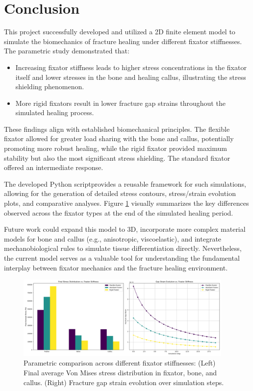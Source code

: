 \documentclass{article}
\begin{document}
\section{Conclusion}
This project successfully developed and utilized a 2D finite element model to simulate the biomechanics of fracture healing under different fixator stiffnesses. The parametric study demonstrated that:
\begin{itemize}
  \item Increasing fixator stiffness leads to higher stress concentrations in the fixator itself and lower stresses in the bone and healing callus, illustrating the stress shielding phenomenon.
  \item More rigid fixators result in lower fracture gap strains throughout the simulated healing process.
\end{itemize}
These findings align with established biomechanical principles. The flexible fixator allowed for greater load sharing with the bone and callus, potentially promoting more robust healing, while the rigid fixator provided maximum stability but also the most significant stress shielding. The standard fixator offered an intermediate response.

The developed Python scriptprovides a reusable framework for such simulations, allowing for the generation of detailed stress contours, stress/strain evolution plots, and comparative analyses. Figure \ref{fig:parametric_comparison} visually summarizes the key differences observed across the fixator types at the end of the simulated healing period.

Future work could expand this model to 3D, incorporate more complex material models for bone and callus (e.g., anisotropic, viscoelastic), and integrate mechanobiological rules to simulate tissue differentiation directly. Nevertheless, the current model serves as a valuable tool for understanding the fundamental interplay between fixator mechanics and the fracture healing environment.

\begin{figure}[htbp]
  \centering
  \includegraphics[width=0.95\textwidth]{../output_advanced/parametric_comparison.png}
  \caption{Parametric comparison across different fixator stiffnesses: (Left) Final average Von Mises stress distribution in fixator, bone, and callus. (Right) Fracture gap strain evolution over simulation steps.}
  \label{fig:parametric_comparison}
\end{figure}
\end{document}
